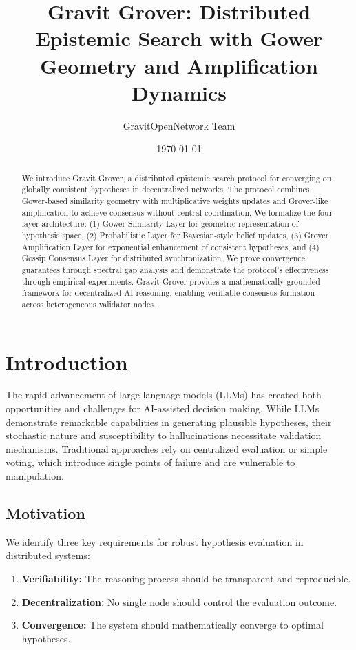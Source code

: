 \documentclass[10pt,a4paper]{article}
\title{Gravit Grover: Distributed Epistemic Search with Gower Geometry and Amplification Dynamics}
\author{GravitOpenNetwork Team}
\date{\today}
\begin{document}
\maketitle

\begin{abstract}
We introduce Gravit Grover, a distributed epistemic search protocol for converging on globally consistent hypotheses in decentralized networks. The protocol combines Gower-based similarity geometry with multiplicative weights updates and Grover-like amplification to achieve consensus without central coordination. We formalize the four-layer architecture: (1) Gower Similarity Layer for geometric representation of hypothesis space, (2) Probabilistic Layer for Bayesian-style belief updates, (3) Grover Amplification Layer for exponential enhancement of consistent hypotheses, and (4) Gossip Consensus Layer for distributed synchronization. We prove convergence guarantees through spectral gap analysis and demonstrate the protocol's effectiveness through empirical experiments. Gravit Grover provides a mathematically grounded framework for decentralized AI reasoning, enabling verifiable consensus formation across heterogeneous validator nodes.
\end{abstract}

\section{Introduction}

The rapid advancement of large language models (LLMs) has created both opportunities and challenges for AI-assisted decision making. While LLMs demonstrate remarkable capabilities in generating plausible hypotheses, their stochastic nature and susceptibility to hallucinations necessitate validation mechanisms. Traditional approaches rely on centralized evaluation or simple voting, which introduce single points of failure and are vulnerable to manipulation.

\subsection{Motivation}

We identify three key requirements for robust hypothesis evaluation in distributed systems:

\begin{enumerate}
    \item \textbf{Verifiability:} The reasoning process should be transparent and reproducible.
    \item \textbf{Decentralization:} No single node should control the evaluation outcome.
    \item \textbf{Convergence:} The system should mathematically converge to optimal hypotheses.
\end{enumerate}
\end{document}
